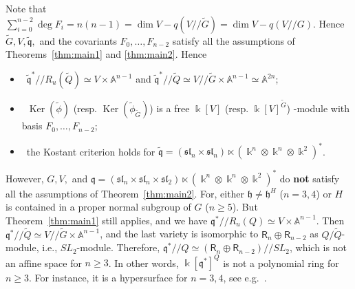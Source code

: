\begin{ex}
Note that $\sum_{i=0}^{n-2} \deg F_i=n(n-1)=\dim V-q(V{/\!\!/} \tilde G)=\dim V-q(V{/\!\!/} G)$.
Hence $\tilde G, V,\tilde{{\mathfrak q}},$ and the covariants $F_0,\dots,F_{n-2}$ satisfy all the assumptions of Theorems~\ref{thm:main1} and \ref{thm:main2}. Hence 
{\sl \begin{itemize}
\item \ $\tilde {{\mathfrak q}}^*{/\!\!/} R_u(\tilde Q)\simeq V\times \mathbb A^{n-1}$ and 
   $\tilde {{\mathfrak q}}^*{/\!\!/} \tilde Q\simeq V{/\!\!/} \tilde G\times \mathbb A^{n-1}\simeq \mathbb A^{2n}$;
\item \ ${\operatorname{Ker}}(\tilde\phi)$ (resp. ${\operatorname{Ker}}(\tilde\phi_{\tilde G})$) is a free ${\Bbbk}[V]$
(resp. ${\Bbbk}[V]^{\tilde G}$)  -module  with basis $F_0,\dots,F_{n-2}$;
\item \ the Kostant criterion holds for 
$\tilde {{\mathfrak q}}=({{\mathfrak{sl}}_n}\times{{\mathfrak{sl}}_n}) \ltimes ({\Bbbk}^n\otimes{\Bbbk}^n\otimes {\Bbbk}^2)^*$. 
\end{itemize}
}
\noindent
However, $G,V,$ and ${{\mathfrak q}}=({{\mathfrak{sl}}_n}\times{{\mathfrak{sl}}_n}\times{\mathfrak{sl}_2}) \ltimes ({\Bbbk}^n\otimes{\Bbbk}^n\otimes {\Bbbk}^2)^*$ do 
{\bf not} satisfy all the assumptions of Theorem~\ref{thm:main2}. For, either 
${{\mathfrak h}}\ne {{\mathfrak h}}^H$ ($n=3,4$) or $H$ is contained in a proper normal subgroup of $G$ ($n{\geqslant} 5$).
But Theorem~\ref{thm:main1} still applies, and we have
${{\mathfrak q}}^*{/\!\!/} R_u(Q)\simeq V\times \mathbb A^{n-1}$. Then 
${{\mathfrak q}}^*{/\!\!/} \tilde Q\simeq V{/\!\!/}\tilde G\times \mathbb A^{n-1}$, and the last variety is isomorphic to 
${\mathsf{R}}_{n}\oplus {\mathsf{R}} _{n-2}$ as $Q/\tilde Q$-module, i.e., $SL_2$-module. Therefore, 
${{\mathfrak q}}^*{/\!\!/} Q\simeq ({\mathsf{R}}_n\oplus {\mathsf{R}}_{n-2}){/\!\!/} SL_2$, which is not an affine space for $n{\geqslant} 3$. In other 
words, ${\Bbbk}[{{\mathfrak q}}^*]^Q$ is not a polynomial ring for $n{\geqslant} 3$. For instance, it is a 
hypersurface for $n=3,4$, see e.g.~\cite[3.4.3]{springer}. 


\end{ex}
